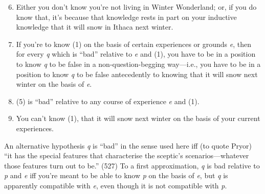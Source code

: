 \begin{enumerate}
\setcounter{enumi}{5}
\item
  Either you don't know you're not living in Winter Wonderland; or, if
  you do know that, it's because that knowledge rests in part on your
  inductive knowledge that it will snow in Ithaca next winter.
\item
  If you're to know (1) on the basis of certain experiences or grounds
  \emph{e}, then for every \emph{q} which is ``bad'' relative to
  \emph{e} and (1), you have to be in a position to know \emph{q} to be
  false in a non-question-begging way---i.e., you have to be in a
  position to know \emph{q} to be false antecedently to knowing that it
  will snow next winter on the basis of \emph{e}.
\item
  (5) is ``bad'' relative to any course of experience \emph{e} and (1).
\item
  You can't know (1), that it will snow next winter on the basis of your
  current experiences.
\end{enumerate}

An alternative hypothesis \emph{q} is ``bad'' in the sense used here iff
(to quote Pryor) ``it has the special features that characterise the
sceptic's scenarios---whatever those features turn out to be.'' (527) To
a first approximation, \emph{q} is bad relative to \emph{p} and \emph{e}
iff you're meant to be able to know \emph{p} on the basis of \emph{e},
but \emph{q} is apparently compatible with \emph{e}, even though it is
not compatible with \emph{p}.

